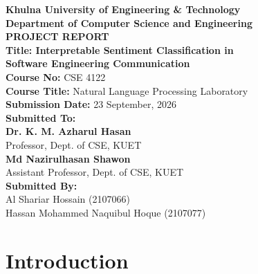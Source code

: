 \documentclass[11pt,a4paper]{article}
\begin{document}
\begin{titlepage}
    \centering
    \vspace*{0.6cm}

    {\LARGE \textbf{Khulna University of Engineering \& Technology}}\\[1.0cm]

    {\large \textbf{Department of Computer Science and Engineering}}\\[1.0cm]

    {\large \textbf{PROJECT REPORT}}\\[1.0cm]

    {\large \textbf{Title: Interpretable Sentiment Classification in\\[0.25cm]
    Software Engineering Communication}}\\[1.0cm]

    {\textbf{Course No:} CSE 4122}\\[0.25cm]
    {\textbf{Course Title:} Natural Language Processing Laboratory}\\[0.25cm]
    {\textbf{Submission Date:} 23 September, 2026}\\[0.9cm]

    {\textbf{Submitted To:}}\\[0.7cm]

    {\textbf{Dr. K. M. Azharul Hasan}}\\[0.15cm]
    {Professor, Dept. of CSE, KUET}\\[0.6cm]

    {\textbf{Md Nazirulhasan Shawon}}\\[0.15cm]
    {Assistant Professor, Dept. of CSE, KUET}\\[1.1cm]

    {\textbf{Submitted By:}}\\[0.4cm]

    {Al Shariar Hossain (2107066)}\\[0.15cm]
    {Hassan Mohammed Naquibul Hoque (2107077)}

    \vfill
\end{titlepage}

\tableofcontents
\newpage

\section{Introduction}
\end{document}
